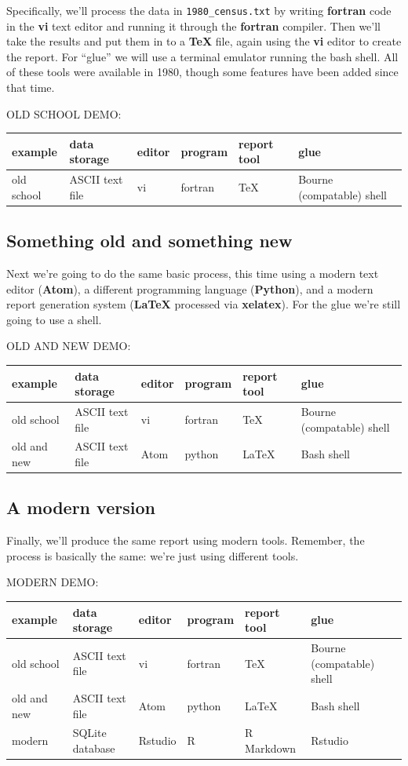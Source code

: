 \documentclass[]{book}
\begin{document}
Specifically, we'll process the data in \texttt{1980\_census.txt} by
writing \textbf{fortran} code in the \textbf{vi} text editor and running
it through the \textbf{fortran} compiler. Then we'll take the results
and put them in to a \textbf{TeX} file, again using the \textbf{vi}
editor to create the report. For ``glue'' we will use a terminal
emulator running the bash shell. All of these tools were available in
1980, though some features have been added since that time.

OLD SCHOOL DEMO:

\begin{longtable}[]{@{}llllll@{}}
\toprule
example & data storage & editor & program & report tool &
glue\tabularnewline
\midrule
\endhead
old school & ASCII text file & vi & fortran & TeX & Bourne (compatable)
shell\tabularnewline
\bottomrule
\end{longtable}

\subsection{Something old and something
new}\label{something-old-and-something-new}

Next we're going to do the same basic process, this time using a modern
text editor (\textbf{Atom}), a different programming language
(\textbf{Python}), and a modern report generation system (\textbf{LaTeX}
processed via \textbf{xelatex}). For the glue we're still going to use a
shell.

OLD AND NEW DEMO:

\begin{longtable}[]{@{}llllll@{}}
\toprule
example & data storage & editor & program & report tool &
glue\tabularnewline
\midrule
\endhead
old school & ASCII text file & vi & fortran & TeX & Bourne (compatable)
shell\tabularnewline
old and new & ASCII text file & Atom & python & LaTeX & Bash
shell\tabularnewline
\bottomrule
\end{longtable}

\subsection{A modern version}\label{a-modern-version}

Finally, we'll produce the same report using modern tools. Remember, the
process is basically the same: we're just using different tools.

MODERN DEMO:

\begin{longtable}[]{@{}llllll@{}}
\toprule
example & data storage & editor & program & report tool &
glue\tabularnewline
\midrule
\endhead
old school & ASCII text file & vi & fortran & TeX & Bourne (compatable)
shell\tabularnewline
old and new & ASCII text file & Atom & python & LaTeX & Bash
shell\tabularnewline
modern & SQLite database & Rstudio & R & R Markdown &
Rstudio\tabularnewline
\bottomrule
\end{longtable}
\end{document}
